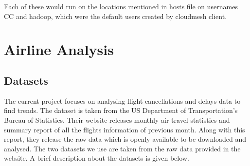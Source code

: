 \documentclass[9pt,twocolumn,twoside]{../../styles/osajnl}
\begin{document}
Each of these would run on the locations mentioned in hosts file on usernames CC and hadoop, which were the default users created by cloudmesh client. 
\section{Airline Analysis}
\subsection{Datasets}
The current project focuses on analysing flight cancellations and delays data to find trends. The dataset is taken from the US Department of Transportation's Bureau of Statistics. Their website releases monthly air travel statistics and summary report of all the flights information of previous month. Along with this report, they release the raw data which is openly available to be downloaded and analysed. The two datasets we use are taken from the raw data provided in the website. A brief description about the datasets is given below.
\end{document}
